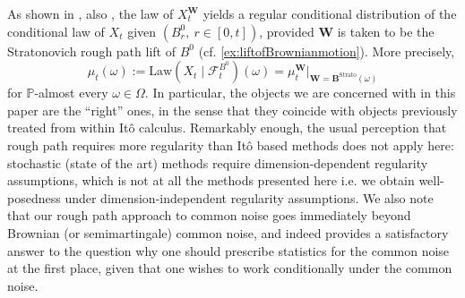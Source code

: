 \documentclass[10pt, a4paper]{article} %
\theoremstyle{definition}
\theoremstyle{plain}
\begin{document}
As shown in \cite[Section 3.3]{FHL25}, also \cite[Section 5]{FLZ25}, the law of $X^\mathbf{W}_t$ yields a regular conditional distribution of the conditional law of $X_t$ given $(B^0_r, \ r \in [0,t])$, provided $\mathbf{W}$ is taken to be the Stratonovich rough path lift of $B^0$ (cf. \cref{ex:liftofBrownianmotion}). More precisely, \begin{equation*}
    \mu_t (\omega) := \text{Law}(X_t \mid \mathcal{F}^{B^0}_t) (\omega) = \mu_t^\mathbf{W} \big|_{\mathbf{W}=\mathbf{B}^{\text{Strato}}(\omega)}
\end{equation*}
for $\mathbb{P}$-almost every $\omega \in \Omega$. In particular, the objects we are concerned with in this paper are the ``right'' ones, in the sense that they coincide with objects previously treated from within It\^o calculus. Remarkably enough, the usual perception that rough path requires more regularity than It\^o based methods does not apply here: stochastic (state of the art) methods \cite{CG19} require dimension-dependent regularity assumptions, which is not at all the methods presented here i.e. we obtain well-posedness under dimension-independent regularity assumptions. 
We also note that our rough path approach to common noise goes immediately beyond Brownian (or semimartingale) common noise, and indeed provides a satisfactory answer to the question why one should prescribe statistics for the common noise at the first place, given that one wishes to work conditionally under the common noise. \\

\end{document}
